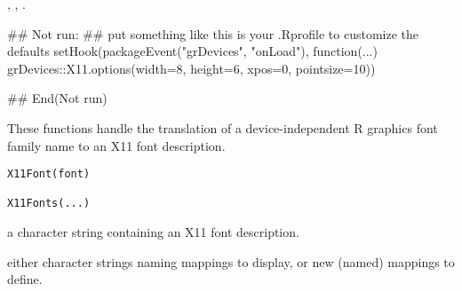 %
\begin{SeeAlso}\relax
{}, , .
\end{SeeAlso}
%
\begin{Examples}
\begin{ExampleCode}
## Not run: 
## put something like this is your .Rprofile to customize the defaults
setHook(packageEvent("grDevices", "onLoad"),
        function(...) grDevices::X11.options(width=8, height=6, xpos=0,
                                             pointsize=10))

## End(Not run)
\end{ExampleCode}
\end{Examples}
%
\begin{Description}\relax
These functions handle the translation of a device-independent R graphics
font family name to an X11 font description.
\end{Description}
%
\begin{Usage}
\begin{verbatim}
X11Font(font)

X11Fonts(...)      
\end{verbatim}
\end{Usage}
%
\begin{Arguments}
\begin{ldescription}
\item[\code{font}] a character string containing an X11 font description.
\item[\code{...}] either character strings naming mappings to display,
or new (named) mappings to define.
\end{ldescription}
\end{Arguments}
%
